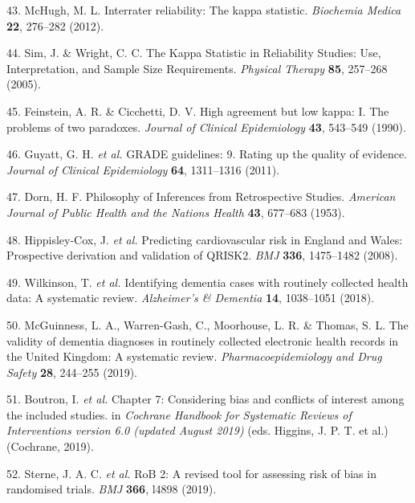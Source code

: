 \documentclass[a4paper, twoside]{templates/ociamthesis}
\begin{document}
\leavevmode\hypertarget{ref-mchugh2012}{}%
43. McHugh, M. L. Interrater reliability: The kappa statistic. \emph{Biochemia Medica} \textbf{22}, 276--282 (2012).

\leavevmode\hypertarget{ref-sim2005}{}%
44. Sim, J. \& Wright, C. C. The Kappa Statistic in Reliability Studies: Use, Interpretation, and Sample Size Requirements. \emph{Physical Therapy} \textbf{85}, 257--268 (2005).

\leavevmode\hypertarget{ref-feinstein1990}{}%
45. Feinstein, A. R. \& Cicchetti, D. V. High agreement but low kappa: I. The problems of two paradoxes. \emph{Journal of Clinical Epidemiology} \textbf{43}, 543--549 (1990).

\leavevmode\hypertarget{ref-guyatt2011}{}%
46. Guyatt, G. H. \emph{et al.} GRADE guidelines: 9. Rating up the quality of evidence. \emph{Journal of Clinical Epidemiology} \textbf{64}, 1311--1316 (2011).

\leavevmode\hypertarget{ref-dorn1953}{}%
47. Dorn, H. F. Philosophy of Inferences from Retrospective Studies. \emph{American Journal of Public Health and the Nations Health} \textbf{43}, 677--683 (1953).

\leavevmode\hypertarget{ref-hippisley-cox2008}{}%
48. Hippisley-Cox, J. \emph{et al.} Predicting cardiovascular risk in England and Wales: Prospective derivation and validation of QRISK2. \emph{BMJ} \textbf{336}, 1475--1482 (2008).

\leavevmode\hypertarget{ref-wilkinson2018a}{}%
49. Wilkinson, T. \emph{et al.} Identifying dementia cases with routinely collected health data: A systematic review. \emph{Alzheimer's \& Dementia} \textbf{14}, 1038--1051 (2018).

\leavevmode\hypertarget{ref-mcguinness2019c}{}%
50. McGuinness, L. A., Warren-Gash, C., Moorhouse, L. R. \& Thomas, S. L. The validity of dementia diagnoses in routinely collected electronic health records in the United Kingdom: A systematic review. \emph{Pharmacoepidemiology and Drug Safety} \textbf{28}, 244--255 (2019).

\leavevmode\hypertarget{ref-cochranechpt7}{}%
51. Boutron, I. \emph{et al.} Chapter 7: Considering bias and conflicts of interest among the included studies. in \emph{Cochrane Handbook for Systematic Reviews of Interventions version 6.0 (updated August 2019)} (eds. Higgins, J. P. T. et al.) (Cochrane, 2019).

\leavevmode\hypertarget{ref-sterne2019rob}{}%
52. Sterne, J. A. C. \emph{et al.} RoB 2: A revised tool for assessing risk of bias in randomised trials. \emph{BMJ} \textbf{366}, l4898 (2019).
\end{document}

